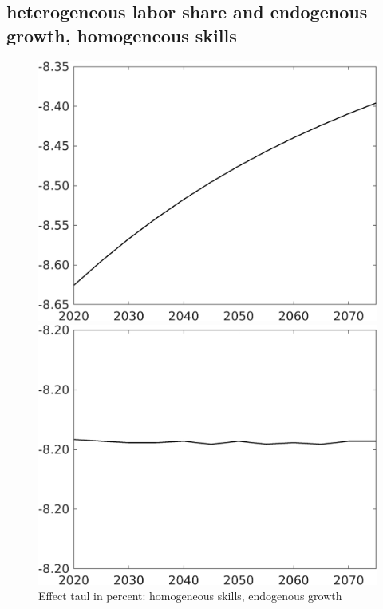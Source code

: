 \documentclass[12pt]{article}
\begin{document}
\subsection{heterogeneous labor share and endogenous growth, homogeneous skills}

\begin{figure}[h!!]
	\centering
	\caption{Effect taul in percent: homogeneous skills, endogenous growth }\label{fig:LF_BAU_nsk1_xgr0}
	\begin{minipage}[]{0.32\textwidth}
		\includegraphics[width=1\textwidth]{../../codding_model/own_basedOnFried/optimalPol_010922_revision/figures/all_13Sept22/CompTaul_LFBAUPer_Reg0_Emnet_spillover0_nsk1_xgr0_knspil0_sep1_countec0_GovRev0_etaa0.79.png}
	\end{minipage}	
	\begin{minipage}[]{0.32\textwidth}
		\includegraphics[width=1\textwidth]{../../codding_model/own_basedOnFried/optimalPol_010922_revision/figures/all_13Sept22/CompTaul_LFBAUPer_Reg0_hh_spillover0_nsk1_xgr0_knspil0_sep1_countec0_GovRev0_etaa0.79.png}

\end{minipage}
\end{figure}
\end{document}
